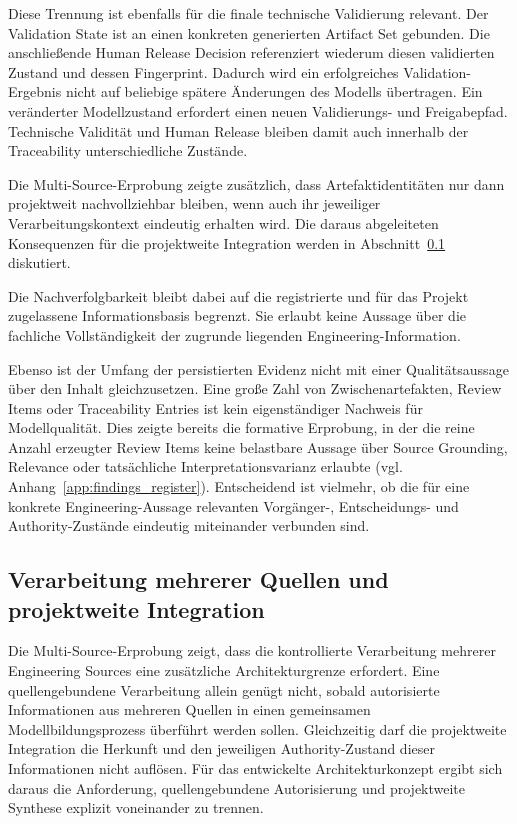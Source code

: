 Diese Trennung ist ebenfalls für die finale technische Validierung relevant.
Der Validation State ist an einen konkreten generierten Artifact Set
gebunden. Die anschließende Human Release Decision referenziert wiederum
diesen validierten Zustand und dessen Fingerprint. Dadurch wird ein
erfolgreiches Validation-Ergebnis nicht auf beliebige spätere Änderungen des
Modells übertragen. Ein veränderter Modellzustand erfordert einen neuen
Validierungs- und Freigabepfad. Technische Validität und Human Release bleiben
damit auch innerhalb der Traceability unterschiedliche Zustände.

Die Multi-Source-Erprobung zeigte zusätzlich, dass Artefaktidentitäten nur
dann projektweit nachvollziehbar bleiben, wenn auch ihr jeweiliger
Verarbeitungskontext eindeutig erhalten wird. Die daraus abgeleiteten
Konsequenzen für die projektweite Integration werden in
Abschnitt~\ref{sec:discussion_multisource} diskutiert.

Die Nachverfolgbarkeit bleibt dabei auf die registrierte und für das Projekt
zugelassene Informationsbasis begrenzt. Sie erlaubt keine Aussage über die
fachliche Vollständigkeit der zugrunde liegenden Engineering-Information.

Ebenso ist der Umfang der persistierten Evidenz nicht mit einer
Qualitätsaussage über den Inhalt gleichzusetzen. Eine große Zahl von
Zwischenartefakten, Review Items oder Traceability Entries ist kein
eigenständiger Nachweis für Modellqualität. Dies zeigte bereits die formative
Erprobung, in der die reine Anzahl erzeugter Review Items keine belastbare
Aussage über Source Grounding, Relevance oder tatsächliche
Interpretationsvarianz erlaubte
(vgl. Anhang~\ref{app:findings_register}). Entscheidend ist vielmehr, ob die
für eine konkrete Engineering-Aussage relevanten Vorgänger-, Entscheidungs-
und Authority-Zustände eindeutig miteinander verbunden sind.

\subsection{Verarbeitung mehrerer Quellen und projektweite Integration}
\label{sec:discussion_multisource}

Die Multi-Source-Erprobung zeigt, dass die kontrollierte Verarbeitung mehrerer
Engineering Sources eine zusätzliche Architekturgrenze erfordert. Eine
quellengebundene Verarbeitung allein genügt nicht, sobald autorisierte
Informationen aus mehreren Quellen in einen gemeinsamen Modellbildungsprozess
überführt werden sollen. Gleichzeitig darf die projektweite Integration die
Herkunft und den jeweiligen Authority-Zustand dieser Informationen nicht
auflösen. Für das entwickelte Architekturkonzept ergibt sich daraus die
Anforderung, quellengebundene Autorisierung und projektweite Synthese explizit
voneinander zu trennen.

